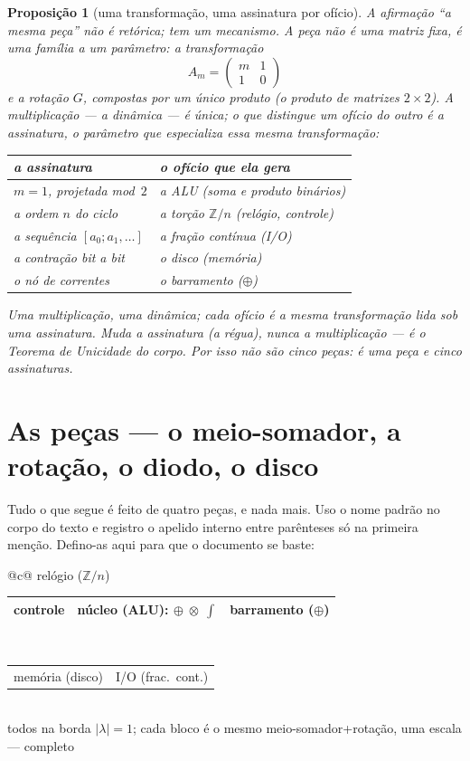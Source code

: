 \documentclass[11pt,a4paper]{article}
\newtheorem{proposicao}{Proposição}
\begin{document}
\begin{proposicao}[uma transformação, uma assinatura por ofício]
A afirmação ``a mesma peça'' não é retórica; tem um mecanismo. A peça não é uma matriz fixa, é uma família a um
parâmetro: a transformação
\[
A_{m} = \begin{pmatrix} m & 1 \\ 1 & 0 \end{pmatrix}
\]
e a rotação $G$, compostas por um único produto (o produto de matrizes $2\times 2$).
A multiplicação --- a dinâmica --- é única; o que distingue um ofício do outro é a assinatura,
o parâmetro que especializa essa mesma transformação:
\begin{center}
\begin{tabular}{@{}ll@{}}
\toprule
a assinatura & o ofício que ela gera \\
\midrule
$m=1$, projetada mod~$2$ & a ALU (soma e produto binários) \\
a ordem $n$ do ciclo & a torção $\mathbb{Z}/n$ (relógio, controle) \\
a sequência $[a_{0};a_{1},\ldots]$ & a fração contínua (I/O) \\
a contração bit a bit & o disco (memória) \\
o nó de correntes & o barramento ($\oplus$) \\
\bottomrule
\end{tabular}
\end{center}
Uma multiplicação, uma dinâmica; cada ofício é a mesma transformação lida sob uma assinatura.
Muda a assinatura (a régua), nunca a multiplicação --- é o Teorema de Unicidade do corpo. Por
isso não são cinco peças: é uma peça e cinco assinaturas.
\end{proposicao}

\section{As peças --- o meio-somador, a rotação, o diodo, o disco}

Tudo o que segue é feito de quatro peças, e nada mais. Uso o nome padrão no corpo do texto
e registro o apelido interno entre parênteses só na primeira menção. Defino-as aqui para que o
documento se baste:

\begin{center}
\begin{tabular}{@{}c@{}}
relógio ($\mathbb{Z}/n$) \\[1.2em]
\begin{tabular}{|c|c|c|}
\hline
controle & núcleo (ALU): $\oplus\;\otimes\;\displaystyle\int$ & barramento ($\oplus$) \\
\hline
\end{tabular} \\[1.2em]
\begin{tabular}{c@{\hspace{3em}}c}
memória (disco) & I/O (frac.\ cont.)
\end{tabular} \\[0.6em]
\footnotesize todos na borda $|\lambda|=1$; cada bloco é o mesmo meio-somador+rotação, uma escala --- completo
\end{tabular}
\end{center}
\end{document}
